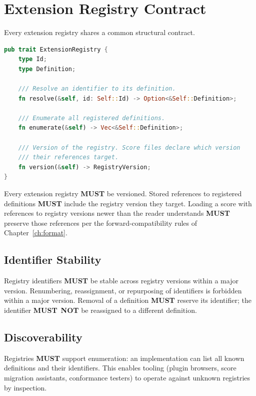\documentclass[11pt,letterpaper]{report}
\newcounter{requirement}[chapter]
\newcommand{\MUST}{\textbf{MUST}}
\newcommand{\MUSTNOT}{\textbf{MUST}\nobreak\ \textbf{NOT}}
\begin{document}
\section{Extension Registry Contract}
\label{sec:ext:registry}

Every extension registry shares a common structural contract.

\begin{lstlisting}[language=Rust]
pub trait ExtensionRegistry {
    type Id;
    type Definition;

    /// Resolve an identifier to its definition.
    fn resolve(&self, id: Self::Id) -> Option<&Self::Definition>;

    /// Enumerate all registered definitions.
    fn enumerate(&self) -> Vec<&Self::Definition>;

    /// Version of the registry. Score files declare which version
    /// their references target.
    fn version(&self) -> RegistryVersion;
}
\end{lstlisting}

\begin{requirement}
  \label{req:ext:registry-versioning}
  Every extension registry \MUST{} be versioned. Stored references
  to registered definitions \MUST{} include the registry version
  they target. Loading a score with references to registry versions
  newer than the reader understands \MUST{} preserve those references
  per the forward-compatibility rules of Chapter~\ref{ch:format}.
\end{requirement}

\subsection{Identifier Stability}

\begin{requirement}
  \label{req:ext:registry-id-stability}
  Registry identifiers \MUST{} be stable across registry versions
  within a major version. Renumbering, reassignment, or repurposing
  of identifiers is forbidden within a major version. Removal of a
  definition \MUST{} reserve its identifier; the identifier \MUSTNOT{}
  be reassigned to a different definition.
\end{requirement}

\subsection{Discoverability}

Registries \MUST{} support enumeration: an implementation can list
all known definitions and their identifiers. This enables tooling
(plugin browsers, score migration assistants, conformance testers)
to operate against unknown registries by inspection.
\end{document}
